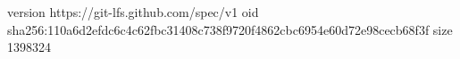 version https://git-lfs.github.com/spec/v1
oid sha256:110a6d2efdc6c4c62fbc31408c738f9720f4862cbc6954e60d72e98cecb68f3f
size 1398324
